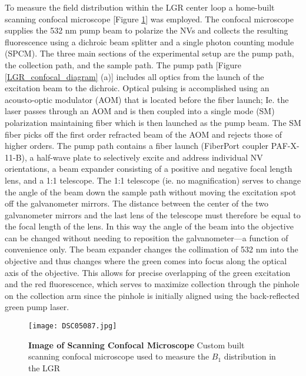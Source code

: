 To measure the field distribution within the LGR center loop a home-built scanning confocal microscope [Figure \ref{LGR_confocal_image}] was employed. The confocal microscope supplies the 532 nm pump beam to polarize the NVs and collects the resulting fluorescence using a dichroic beam splitter and a single photon counting module (SPCM). The three main sections of the experimental setup are the pump path, the collection path, and the sample path. The pump path [Figure \ref{LGR_confocal_diagram} (a)] includes all optics from the launch of the excitation beam to the dichroic. Optical pulsing is accomplished using an acousto-optic modulator (AOM) that is located before the fiber launch; Ie. the laser passes through an AOM and is then coupled into a single mode (SM) polarization maintaining fiber which is then launched as the pump beam. The SM fiber picks off the first order refracted beam of the AOM and rejects those of higher orders. The pump path contains a fiber launch (FiberPort coupler PAF-X-11-B), a half-wave plate to selectively excite and address individual NV orientations, a beam expander consisting of a positive and negative focal length lens, and a 1:1 telescope. The 1:1 telescope (ie. no magnification) serves to change the angle of the beam down the sample path without moving the excitation spot off the galvanometer mirrors. The distance between the center of the two galvanometer mirrors and the last lens of the telescope must therefore be equal to the focal length of the lens. In this way the angle of the beam into the objective can be changed without needing to reposition the galvanometer---a function of convenience only. The beam expander changes the collimation of 532 nm into the objective and thus changes where the green comes into focus along the optical axis of the objective. This allows for precise overlapping of the green excitation and the red fluorescence, which serves to maximize collection through the pinhole on the collection arm since the pinhole is initially aligned using the back-reflected green pump laser.

\begin{figure}[t!]
\centering
\texttt{[image: DSC05087.jpg]}  
\caption{\textbf{Image of Scanning Confocal Microscope} Custom built scanning confocal microscope used to measure the $B_1$ distribution in the LGR}
\label{LGR_confocal_image}
\end{figure}

